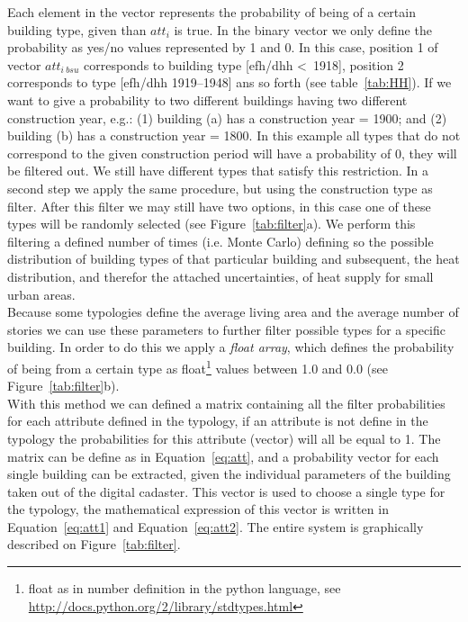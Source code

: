 Each element in the vector represents the probability of being of a certain
building type, given than $att_i$ is true.  In the binary vector we only define
the probability as yes/no values represented by 1 and 0. In this case,
position 1 of vector $att_{i~bsu}$ corresponds to building type [efh/dhh
\textless~1918], position 2 corresponds to type [efh/dhh 1919--1948] ans so
forth (see table~\ref{tab:HH}).  If we want to give a probability to two
different buildings having two different construction year, e.g.: (1) building
(a) has a construction year = 1900; and (2) building (b) has a construction
year = 1800. In this example all types that do not correspond to the given
construction period will have a probability of 0, they will be filtered out.
We still have different types that satisfy this restriction. In a second step
we apply the same procedure, but using the construction type as filter. After
this filter we may still have two options, in this case one of these types will be
randomly selected (see Figure~\ref{tab:filter}a). We perform this filtering a
defined number of times (i.e. Monte Carlo) defining so the possible distribution
of building types of that particular building and subsequent, the heat
distribution, and therefor the attached uncertainties, of heat supply for small
urban areas.\\

Because some typologies define the average living area and the average
number of stories we can use these parameters to further filter possible types
for a specific building. In order to do this we apply a \textit{float array},
which defines the probability of being from a certain type as
float\footnote{float as in number definition in the python language, see
    \url{http://docs.python.org/2/library/stdtypes.html}} values between 1.0
and 0.0 (see Figure~\ref{tab:filter}b).\\

With this method we can defined a matrix containing all the filter probabilities
for each attribute defined in the typology, if an attribute is not define in
the typology the probabilities for this attribute (vector) will all be equal to
1. The matrix can be define as in Equation~\ref{eq:att}, and a probability
vector for each single building can be extracted, given the individual
parameters of the building taken out of the digital cadaster. This vector is
used to choose a single type for the typology, the mathematical expression of
this vector is written in Equation~\ref{eq:att1} and Equation~\ref{eq:att2}.
The entire system is graphically described on Figure~\ref{tab:filter}.\\

